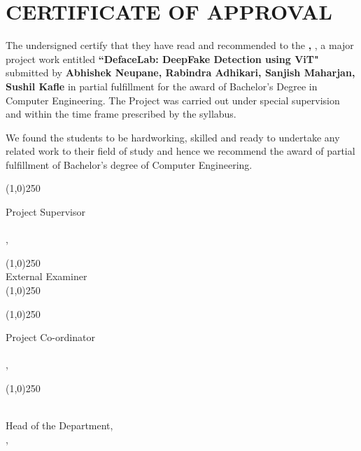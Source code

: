 \section*{CERTIFICATE OF APPROVAL}
\begingroup
\setlength{\parskip}{0pt}

The undersigned certify that they have read and recommended to the \textbf{\thedepartment,  \thecampus}, a major
project work entitled \textbf{“DefaceLab:  DeepFake Detection using ViT"} submitted by \textbf{Abhishek Neupane, Rabindra Adhikari, Sanjish Maharjan, Sushil Kafle} in partial fulfillment for the award of Bachelor’s
Degree in Computer Engineering. The Project was carried out
under special supervision and within the time frame prescribed by the syllabus.

\vspace{0.7cm}

\noindent We found the students to be hardworking, skilled and ready to undertake any related
work to their field of study and hence we recommend the award of partial fulfillment
of Bachelor’s degree of Computer Engineering.

\vspace{0.7cm}

\noindent \line(1,0){250}

\noindent Project Supervisor \\
\thesupervisor \\
\thedepartment, \thecampus


\vspace{0.5cm}
\noindent \line(1,0){250}\\
\noindent External Examiner \\

\noindent \line(1,0){250}\\

\vspace{0.3cm}

\noindent \line(1,0){250}

\noindent Project Co-ordinator \\
\theprogramcoordinator \\
\thedepartment, \thecampus

\vspace{0.4cm}

\noindent \line(1,0){250}

\noindent \theHOD \\
Head of the Department, \\
\thedepartment, \thecampus

\vspace{0.3cm}

\noindent \thedate
\endgroup